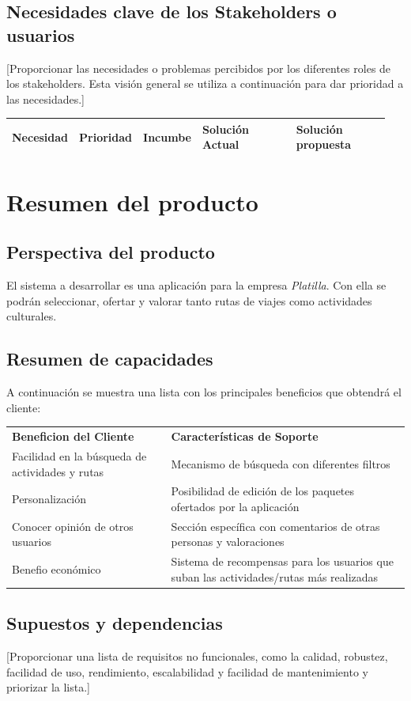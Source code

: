 \documentclass[11pt]{article}
\begin{document}
\subsection{Necesidades clave de los Stakeholders o usuarios}
[Proporcionar las necesidades o problemas percibidos por los diferentes roles de los stakeholders. Esta visión general se utiliza a continuación para dar prioridad a las necesidades.]
          
\begin{table}[H]
  \centering
  \begin{tabular}{p{0.15\linewidth}p{0.15\linewidth}p{0.15\linewidth}p{0.25\linewidth}p{0.25\linewidth}}
    \toprule
    \textbf{Necesidad} & \textbf{Prioridad} & \textbf{Incumbe} & \textbf{Solución Actual} & \textbf{Solución propuesta} \\
    \midrule
    \bottomrule
  \end{tabular}
\end{table}
\newpage

\section{Resumen del producto}
\subsection{Perspectiva del producto}
 El sistema a desarrollar es una aplicación para la empresa \textit{Platilla}. Con ella se podrán seleccionar, ofertar y valorar tanto rutas de viajes como actividades culturales.


\subsection{Resumen de capacidades}
A continuación se muestra una lista con los principales beneficios que obtendrá el cliente:

\begin{table}[H]
  \centering
  \begin{tabular}{p{0.4\linewidth}p{0.6\linewidth}}
    \toprule
    \textbf{Beneficion del Cliente} & \textbf{Características de Soporte} \\
     Facilidad en la búsqueda de actividades y rutas & Mecanismo de búsqueda con diferentes filtros \\
     Personalización & Posibilidad de edición de los paquetes ofertados por la aplicación \\
     Conocer opinión de otros usuarios & Sección específica con comentarios de otras personas y valoraciones\\
     Benefio económico & Sistema de recompensas para los usuarios que suban las actividades/rutas más realizadas \\
    \midrule
    \bottomrule
  \end{tabular}
\end{table}

\subsection{Supuestos y dependencias}
[Proporcionar una lista de requisitos no funcionales, como la calidad, robustez, facilidad de uso, rendimiento, escalabilidad y facilidad de mantenimiento y priorizar la lista.]
\end{document}
